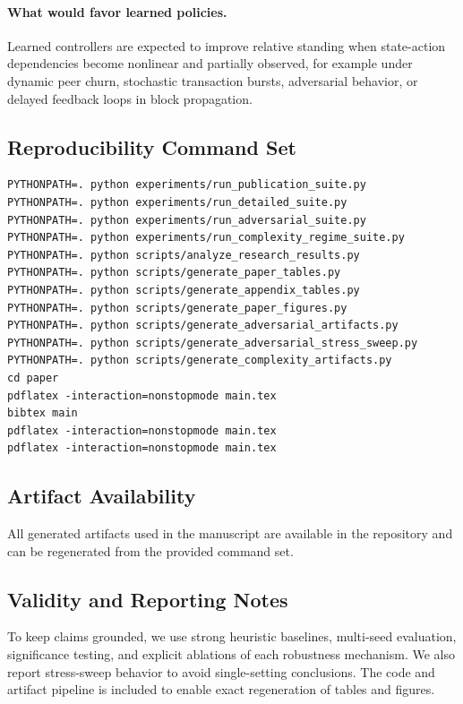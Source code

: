 \paragraph{What would favor learned policies.}
Learned controllers are expected to improve relative standing when state-action dependencies become nonlinear and partially observed, for example under dynamic peer churn, stochastic transaction bursts, adversarial behavior, or delayed feedback loops in block propagation.

\subsection{Reproducibility Command Set}

\begin{verbatim}
PYTHONPATH=. python experiments/run_publication_suite.py
PYTHONPATH=. python experiments/run_detailed_suite.py
PYTHONPATH=. python experiments/run_adversarial_suite.py
PYTHONPATH=. python experiments/run_complexity_regime_suite.py
PYTHONPATH=. python scripts/analyze_research_results.py
PYTHONPATH=. python scripts/generate_paper_tables.py
PYTHONPATH=. python scripts/generate_appendix_tables.py
PYTHONPATH=. python scripts/generate_paper_figures.py
PYTHONPATH=. python scripts/generate_adversarial_artifacts.py
PYTHONPATH=. python scripts/generate_adversarial_stress_sweep.py
PYTHONPATH=. python scripts/generate_complexity_artifacts.py
cd paper
pdflatex -interaction=nonstopmode main.tex
bibtex main
pdflatex -interaction=nonstopmode main.tex
pdflatex -interaction=nonstopmode main.tex
\end{verbatim}

\subsection{Artifact Availability}

All generated artifacts used in the manuscript are available in the repository and can be regenerated from the provided command set.

\subsection{Validity and Reporting Notes}

To keep claims grounded, we use strong heuristic baselines, multi-seed evaluation, significance testing, and explicit ablations of each robustness mechanism. We also report stress-sweep behavior to avoid single-setting conclusions. The code and artifact pipeline is included to enable exact regeneration of tables and figures.

